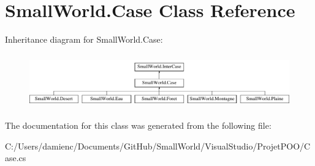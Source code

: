 \hypertarget{class_small_world_1_1_case}{\section{Small\-World.\-Case Class Reference}
\label{class_small_world_1_1_case}
}
Inheritance diagram for Small\-World.\-Case\-:\begin{figure}[H]
\begin{center}
\leavevmode
\includegraphics[height=2.349650cm]{class_small_world_1_1_case}
\end{center}
\end{figure}


The documentation for this class was generated from the following file\-:\begin{DoxyCompactItemize}
\item 
C\-:/\-Users/damienc/\-Documents/\-Git\-Hub/\-Small\-World/\-Visual\-Studio/\-Projet\-P\-O\-O/Case.\-cs\end{DoxyCompactItemize}
